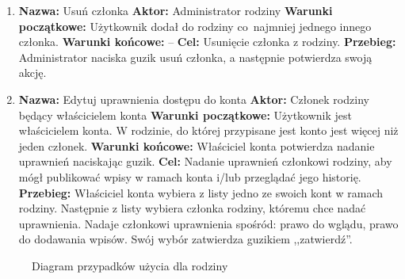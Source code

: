 \begin{enumerate}[labelwidth=1em,label=\arabic*.]
\item \textbf{Nazwa:} Usuń członka \newline
    \textbf{Aktor:} Administrator rodziny \newline
    \textbf{Warunki początkowe:} Użytkownik dodał do rodziny co~najmniej jednego innego członka. \newline
    \textbf{Warunki końcowe:} --  \newline
    \textbf{Cel:} Usunięcie członka z rodziny. \newline
    \textbf{Przebieg:} Administrator naciska guzik usuń członka, a następnie potwierdza swoją akcję.
\item \textbf{Nazwa:} Edytuj uprawnienia dostępu do konta \newline
    \textbf{Aktor:} Członek rodziny będący właścicielem konta \newline
    \textbf{Warunki początkowe:} Użytkownik jest właścicielem konta. W rodzinie, do której przypisane jest konto jest więcej niż jeden członek. \newline
    \textbf{Warunki końcowe:} Właściciel konta potwierdza nadanie uprawnień naciskając guzik. \newline
    \textbf{Cel:} Nadanie uprawnień członkowi rodziny, aby mógł publikować wpisy w ramach konta i/lub przeglądać jego historię.  \newline
    \textbf{Przebieg:} Właściciel konta wybiera z listy jedno ze swoich kont w ramach rodziny. Następnie z listy wybiera członka rodziny, któremu chce nadać uprawnienia. Nadaje członkowi uprawnienia spośród: prawo do wglądu, prawo do dodawania wpisów.
    Swój wybór zatwierdza guzikiem ,,zatwierdź''.
\end{enumerate}

\begin{figure}[t]
	\centering
	\caption{Diagram przypadków użycia dla rodziny}
	\label{fig:use-case-family}
\end{figure}

